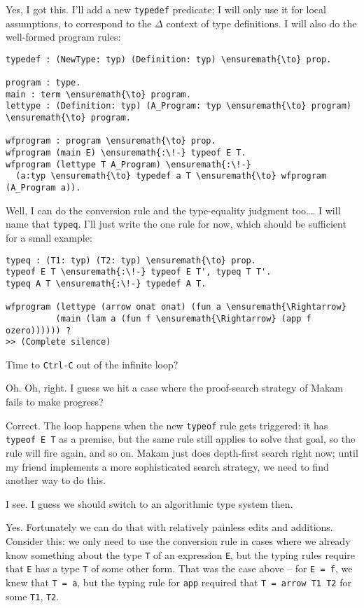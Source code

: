 \heroSTUDENT{} Yes, I got this. I'll add a new \texttt{typedef} predicate; I
will only use it for local assumptions, to correspond to the \(\Delta\)
context of type definitions. I will also do the well-formed program
rules:

\begin{verbatim}
typedef : (NewType: typ) (Definition: typ) \ensuremath{\to} prop.

program : type. 
main : term \ensuremath{\to} program. 
lettype : (Definition: typ) (A_Program: typ \ensuremath{\to} program) \ensuremath{\to} program.

wfprogram : program \ensuremath{\to} prop.
wfprogram (main E) \ensuremath{:\!-} typeof E T.
wfprogram (lettype T A_Program) \ensuremath{:\!-}
  (a:typ \ensuremath{\to} typedef a T \ensuremath{\to} wfprogram (A_Program a)).
\end{verbatim}

\noindent
Well, I can do the conversion rule and the type-equality judgment
too\ldots{}. I will name that \texttt{typeq}. I'll just write the one
rule for now, which should be sufficient for a small example:

\begin{verbatim}
typeq : (T1: typ) (T2: typ) \ensuremath{\to} prop.
typeof E T \ensuremath{:\!-} typeof E T', typeq T T'.
typeq A T \ensuremath{:\!-} typedef A T.

wfprogram (lettype (arrow onat onat) (fun a \ensuremath{\Rightarrow}
          (main (lam a (fun f \ensuremath{\Rightarrow} (app f ozero)))))) ?
>> (Complete silence)
\end{verbatim}

\heroADVISOR{} Time to \texttt{Ctrl-C} out of the infinite loop?

\heroSTUDENT{} Oh. Oh, right. I guess we hit a case where the proof-search
strategy of Makam fails to make progress?

\heroADVISOR{} Correct. The loop happens when the new \texttt{typeof} rule
gets triggered: it has \texttt{typeof\ E\ T\textquotesingle{}} as a
premise, but the same rule still applies to solve that goal, so the rule
will fire again, and so on. Makam just does depth-first search right
now; until my friend implements a more sophisticated search strategy, we
need to find another way to do this.

\heroSTUDENT{} I see. I guess we should switch to an algorithmic type system
then.

\heroADVISOR{} Yes. Fortunately we can do that with relatively painless edits
and additions. Consider this: we only need to use the conversion rule in
cases where we already know something about the type \texttt{T} of an
expression \texttt{E}, but the typing rules require that \texttt{E} has
a type \texttt{T\textquotesingle{}} of some other form. That was the
case above -- for \texttt{E\ =\ f}, we knew that \texttt{T\ =\ a}, but
the typing rule for \texttt{app} required that
\texttt{T\textquotesingle{}\ =\ arrow\ T1\ T2} for some \texttt{T1},
\texttt{T2}.

